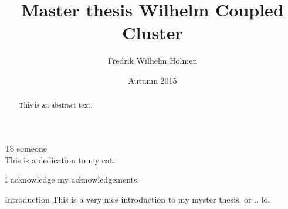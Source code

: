 \documentclass[twoside,english]{uiofysmaster}
\author{Fredrik Wilhelm Holmen}
\title{Master thesis Wilhelm Coupled Cluster}
\date{Autumn 2015}
\begin{document}
\setlength{\belowdisplayskip}{12pt} \setlength{\belowdisplayshortskip}{12pt}
\setlength{\abovedisplayskip}{12pt} \setlength{\abovedisplayshortskip}{12pt}


\maketitle

\begin{abstract}
  This is an abstract text.
\end{abstract}

\begin{dedication}
  To someone
  \\\vspace{12pt}
  This is a dedication to my cat.
\end{dedication}

\begin{acknowledgements}
  I acknowledge my acknowledgements.
\end{acknowledgements}

\tableofcontents



\begin{chapter}{Introduction}
  This is a very nice introduction to my myster thesis.
  or ..
  lol
\end{chapter}
\end{document}
